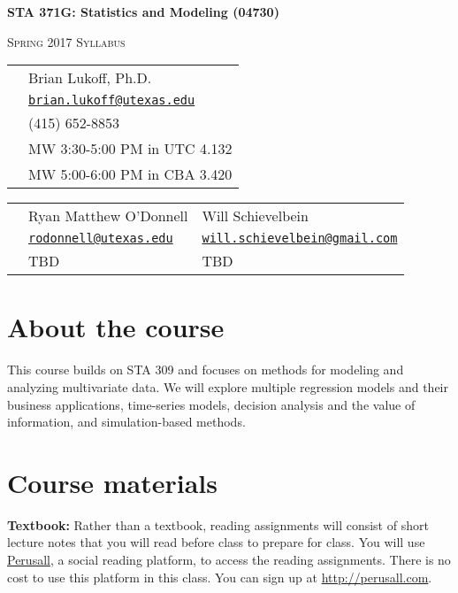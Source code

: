 \documentclass[12pt]{article}
\begin{document}
\pagestyle{fancy}
\thispagestyle{empty}

\begin{center}
\textbf{\Large STA 371G: Statistics and Modeling (04730)}

\textsc{\large Spring 2017 Syllabus}

\bigskip

\begin{tabular}{rl}
\noindent {\bf Instructor:} & Brian Lukoff, Ph.D. \\
\noindent {\bf Email:} & \href{mailto:brian.lukoff@utexas.edu}{\tt brian.lukoff@utexas.edu} \\
\noindent {\bf Phone:} & (415) 652-8853 \\
\noindent {\bf Class Meetings:} & MW 3:30-5:00 PM in UTC 4.132 \\
\noindent {\bf Office Hours:} & MW 5:00-6:00 PM in CBA 3.420 \\
\end{tabular}

\begin{tabular}{rll}
\noindent {\bf TAs:} & Ryan Matthew O'Donnell & Will Schievelbein \\
\noindent {\bf Email:} & \href{mailto:rodonnell@utexas.edu}{\tt rodonnell@utexas.edu} & \href{mailto: will.schievelbein@gmail.com}{\tt  will.schievelbein@gmail.com} \\
\noindent {\bf Office Hours:} & TBD & TBD \\
\end{tabular}

\end{center}

\section*{About the course}

This course builds on STA 309 and focuses on methods for modeling and analyzing multivariate data.  We will explore multiple regression models and their business applications, time-series models, decision analysis and the value of information, and simulation-based methods.

\section*{Course materials}

\textbf{Textbook:} Rather than a textbook, reading assignments will consist of short lecture notes that you will read before class to prepare for class.  You will use \href{http://perusall.com}{Perusall}, a social reading platform, to access the reading assignments. There is no cost to use this platform in this class. You can sign up at \url{http://perusall.com}.
\end{document}
